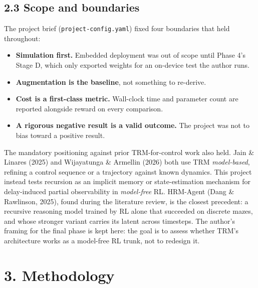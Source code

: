 \documentclass[11pt]{article}
\begin{document}
\subsection*{2.3 Scope and boundaries}



The project brief (\texttt{project-config.\allowbreak{}yaml}) fixed four boundaries that held throughout:



\begin{itemize}
\item \textbf{Simulation first.} Embedded deployment was out of scope until Phase 4's Stage D, which only exported weights for an on-device test the author runs.
\item \textbf{Augmentation is the baseline}, not something to re-derive.
\item \textbf{Cost is a first-class metric.} Wall-clock time and parameter count are reported alongside reward on every comparison.
\item \textbf{A rigorous negative result is a valid outcome.} The project was not to bias toward a positive result.
\end{itemize}



The mandatory positioning against prior TRM-for-control work also held. Jain \& Linares (2025) and Wijayatunga \& Armellin (2026) both use TRM \emph{model-based}, refining a control sequence or a trajectory against known dynamics. This project instead tests recursion as an implicit memory or state-estimation mechanism for delay-induced partial observability in \emph{model-free} RL. HRM-Agent (Dang \& Rawlinson, 2025), found during the literature review, is the closest precedent: a recursive reasoning model trained by RL alone that succeeded on discrete mazes, and whose stronger variant carries its latent across timesteps. The author's framing for the final phase is kept here: the goal is to assess whether TRM's architecture works as a model-free RL trunk, not to redesign it.



\medskip



\section*{3. Methodology}
\end{document}
